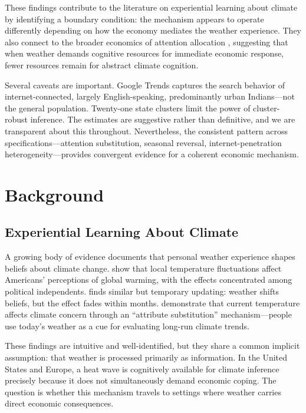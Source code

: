 \documentclass[12pt]{article}
\begin{document}
These findings contribute to the literature on experiential learning about climate \citep{eganmullin2012, deryugina2013, zaval2014} by identifying a boundary condition: the mechanism appears to operate differently depending on how the economy mediates the weather experience. They also connect to the broader economics of attention allocation \citep{sims2003rational, gabaix2014sparsity}, suggesting that when weather demands cognitive resources for immediate economic response, fewer resources remain for abstract climate cognition.

Several caveats are important. Google Trends captures the search behavior of internet-connected, largely English-speaking, predominantly urban Indians---not the general population. Twenty-one state clusters limit the power of cluster-robust inference. The estimates are suggestive rather than definitive, and we are transparent about this throughout. Nevertheless, the consistent pattern across specifications---attention substitution, seasonal reversal, internet-penetration heterogeneity---provides convergent evidence for a coherent economic mechanism.


\section{Background}
\label{sec:background}

\subsection{Experiential Learning About Climate}

A growing body of evidence documents that personal weather experience shapes beliefs about climate change. \citet{eganmullin2012} show that local temperature fluctuations affect Americans' perceptions of global warming, with the effects concentrated among political independents. \citet{deryugina2013} finds similar but temporary updating: weather shifts beliefs, but the effect fades within months. \citet{zaval2014} demonstrate that current temperature affects climate concern through an ``attribute substitution'' mechanism---people use today's weather as a cue for evaluating long-run climate trends.

These findings are intuitive and well-identified, but they share a common implicit assumption: that weather is processed primarily as information. In the United States and Europe, a heat wave is cognitively available for climate inference precisely because it does not simultaneously demand economic coping. The question is whether this mechanism travels to settings where weather carries direct economic consequences.
\end{document}
